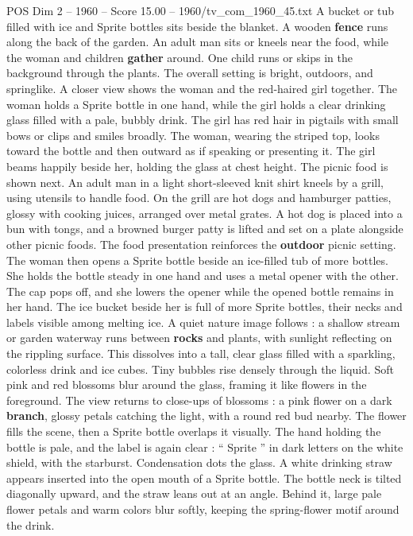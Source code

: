 \begin{textsample}{POS Dim 2 – 1960 – Score 15.00 – 1960/tv\_com\_1960\_45.txt}
A bucket or tub filled with ice and Sprite bottles sits beside the blanket.
A wooden \textbf{fence} runs along the back of the garden.
An adult man sits or kneels near the food, while the woman and children \textbf{gather} around.
One child runs or skips in the background through the plants.
The overall setting is bright, outdoors, and springlike.
A closer view shows the woman and the red-haired girl together.
The woman holds a Sprite bottle in one hand, while the girl holds a clear drinking glass filled with a pale, bubbly drink.
The girl has red hair in pigtails with small bows or clips and smiles broadly.
The woman, wearing the striped top, looks toward the bottle and then outward as if speaking or presenting it.
The girl beams happily beside her, holding the glass at chest height.
The picnic food is shown next.
An adult man in a light short-sleeved knit shirt kneels by a grill, using utensils to handle food.
On the grill are hot dogs and hamburger patties, glossy with cooking juices, arranged over metal grates.
A hot dog is placed into a bun with tongs, and a browned burger patty is lifted and set on a plate alongside other picnic foods.
The food presentation reinforces the \textbf{outdoor} picnic setting.
The woman then opens a Sprite bottle beside an ice-filled tub of more bottles.
She holds the bottle steady in one hand and uses a metal opener with the other.
The cap pops off, and she lowers the opener while the opened bottle remains in her hand.
The ice bucket beside her is full of more Sprite bottles, their necks and labels visible among melting ice.
A quiet nature image follows : a shallow stream or garden waterway runs between \textbf{rocks} and plants, with sunlight reflecting on the rippling surface.
This dissolves into a tall, clear glass filled with a sparkling, colorless drink and ice cubes.
Tiny bubbles rise densely through the liquid.
Soft pink and red blossoms blur around the glass, framing it like flowers in the foreground.
The view returns to close-ups of blossoms : a pink flower on a dark \textbf{branch}, glossy petals catching the light, with a round red bud nearby.
The flower fills the scene, then a Sprite bottle overlaps it visually.
The hand holding the bottle is pale, and the label is again clear : “ Sprite ” in dark letters on the white shield, with the starburst.
Condensation dots the glass.
A white drinking straw appears inserted into the open mouth of a Sprite bottle.
The bottle neck is tilted diagonally upward, and the straw leans out at an angle.
Behind it, large pale flower petals and warm colors blur softly, keeping the spring-flower motif around the drink.

\end{textsample}
